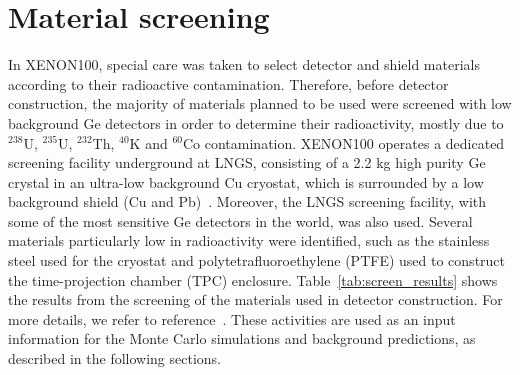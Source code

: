 \section{Material screening} \label{sec:screening}

In XENON100, special care was taken to select detector and
shield materials according to their radioactive contamination. Therefore, before 
detector construction, the majority of materials planned to be
used were screened with low background Ge detectors in order to determine their radioactivity, mostly due to $^{238}$U, 
$^{235}$U, $^{232}$Th, $^{40}$K and $^{60}$Co contamination.
XENON100 operates a dedicated screening facility underground at LNGS, 
consisting of a 2.2 kg high purity Ge crystal in an ultra-low background Cu
cryostat, which is surrounded by a 
low background shield (Cu and Pb)~\cite{gator}. Moreover, the LNGS screening facility, with some
of the most sensitive Ge detectors in the world, was also used.
Several materials particularly low in radioactivity were 
identified, such as the stainless steel used for the cryostat and
polytetrafluoroethylene (PTFE) used
to construct the time-projection chamber (TPC) enclosure.  
Table~\ref{tab:screen_results} shows the results from the screening of the materials used in detector construction. For more details, we refer to reference~\cite{screening}.
These activities are used as an input information for the Monte Carlo simulations and background predictions, as described in the following sections.

